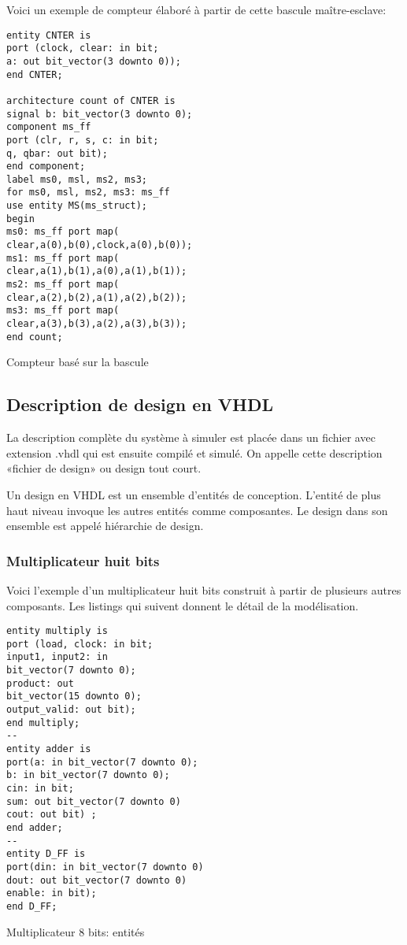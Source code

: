\documentclass[11pt]{article}
\begin{document}
Voici un exemple de compteur élaboré à partir de cette bascule maître-esclave:

\begin{listing}[htbp]
\begin{verbatim}
entity CNTER is
port (clock, clear: in bit;
a: out bit_vector(3 downto 0));
end CNTER;

architecture count of CNTER is
signal b: bit_vector(3 downto 0);
component ms_ff
port (clr, r, s, c: in bit;
q, qbar: out bit);
end component;
label ms0, msl, ms2, ms3;
for ms0, msl, ms2, ms3: ms_ff
use entity MS(ms_struct);
begin
ms0: ms_ff port map(
clear,a(0),b(0),clock,a(0),b(0));
ms1: ms_ff port map(
clear,a(1),b(1),a(0),a(1),b(1));
ms2: ms_ff port map(
clear,a(2),b(2),a(1),a(2),b(2));
ms3: ms_ff port map(
clear,a(3),b(3),a(2),a(3),b(3));
end count;
\end{verbatim}
\caption{Compteur basé sur la bascule}
\end{listing}


\subsection{Description de design en VHDL}
\label{sec:orge4925b9}

La description complète du système à simuler est placée dans un
fichier avec extension .vhdl qui est ensuite compilé et simulé.  On
appelle cette description «fichier de design» ou design tout court.

Un design en VHDL est un ensemble d'entités de conception. L'entité de
plus haut niveau invoque les autres entités comme composantes. Le design
dans son ensemble est appelé hiérarchie de design.

\subsubsection{Multiplicateur huit bits}
\label{sec:orgbe07a4d}

Voici l'exemple d'un multiplicateur huit bits construit à partir de
plusieurs autres composants.  Les listings qui suivent donnent le
détail de la modélisation.

\begin{listing}[htbp]
\begin{verbatim}
entity multiply is
port (load, clock: in bit;
input1, input2: in
bit_vector(7 downto 0);
product: out
bit_vector(15 downto 0);
output_valid: out bit);
end multiply;
--
entity adder is
port(a: in bit_vector(7 downto 0);
b: in bit_vector(7 downto 0);
cin: in bit;
sum: out bit_vector(7 downto 0)
cout: out bit) ;
end adder;
--
entity D_FF is
port(din: in bit_vector(7 downto 0)
dout: out bit_vector(7 downto 0)
enable: in bit);
end D_FF;
\end{verbatim}
\caption{Multiplicateur 8 bits: entités}
\end{listing}
\end{document}

